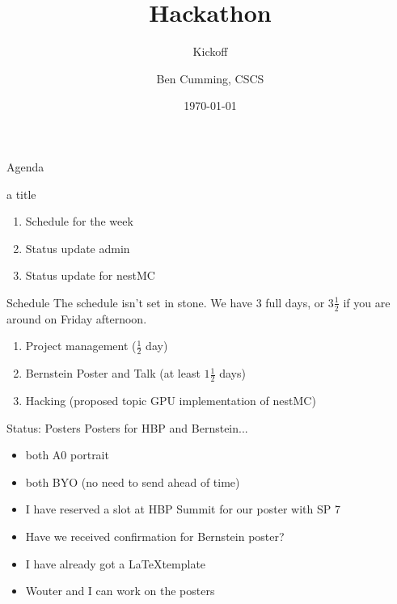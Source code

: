 \documentclass[aspectratio=43]{beamer}
\author{Ben Cumming, CSCS}
\title{\nestmc Hackathon}
\subtitle{Kickoff}
\date{\today}
\newcommand{\nestmc}{nestMC}
\begin{document}
\cscstitle

\begin{frame}
\end{frame}

\begin{frame}{Agenda}
    \begin{info}{a title}
        \begin{enumerate}
            \item Schedule for the week
            \item Status update admin
            \item Status update for \nestmc
        \end{enumerate}
    \end{info}
\end{frame}

\begin{frame}{Schedule}
    The schedule isn't set in stone. We have 3 full days, or $3\frac{1}{2}$ if you are around on Friday afternoon.
    \begin{enumerate}
        \item   Project management ($\frac{1}{2}$ day)
        \item   Bernstein Poster and Talk (at least $1\frac{1}{2}$ days)
        \item   Hacking (proposed topic GPU implementation of \nestmc)
    \end{enumerate}
\end{frame}

\begin{frame}{Status: Posters}
    Posters for HBP and Bernstein...
    \begin{itemize}
        \item   both A0 portrait
        \item   both BYO (no need to send ahead of time)
        \item   I have reserved a slot at HBP Summit for our poster with SP 7
        \item   Have we received confirmation for Bernstein poster?
        \item   I have already got a \LaTeX template
        \item   Wouter and I can work on the posters
    \end{itemize}
\end{frame}
\end{document}
